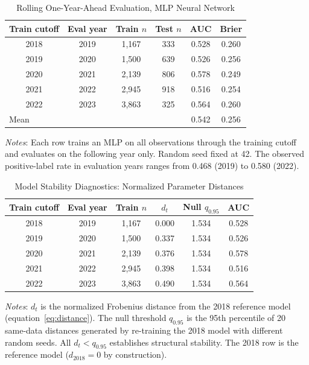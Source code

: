 \documentclass[12pt]{article}
\begin{document}
\begin{table}[H]
\centering
\caption{Rolling One-Year-Ahead Evaluation, MLP Neural Network}\label{tab:rolling}
\begin{threeparttable}
\begin{tabular}{cccccc}
\toprule
Train cutoff & Eval year & Train $n$ & Test $n$ & AUC & Brier \\
\midrule
2018 & 2019 & 1,167 & 333 & 0.528 & 0.260 \\
2019 & 2020 & 1,500 & 639 & 0.526 & 0.256 \\
2020 & 2021 & 2,139 & 806 & 0.578 & 0.249 \\
2021 & 2022 & 2,945 & 918 & 0.516 & 0.254 \\
2022 & 2023 & 3,863 & 325 & 0.564 & 0.260 \\
\midrule
\multicolumn{4}{l}{Mean} & 0.542 & 0.256 \\
\bottomrule
\end{tabular}
\begin{tablenotes}
  \small
  \item \textit{Notes}: Each row trains an MLP on all observations through
  the training cutoff and evaluates on the following year only.  Random
  seed fixed at 42.  The observed positive-label rate in evaluation years
  ranges from 0.468 (2019) to 0.580 (2022).
\end{tablenotes}
\end{threeparttable}
\end{table}

\bigskip

\begin{table}[H]
\centering
\caption{Model Stability Diagnostics: Normalized Parameter Distances}\label{tab:stability}
\begin{threeparttable}
\begin{tabular}{cccccc}
\toprule
Train cutoff & Eval year & Train $n$ & $d_t$ & Null $q_{0.95}$ & AUC \\
\midrule
2018 & 2019 & 1,167 & 0.000 & 1.534 & 0.528 \\
2019 & 2020 & 1,500 & 0.337 & 1.534 & 0.526 \\
2020 & 2021 & 2,139 & 0.376 & 1.534 & 0.578 \\
2021 & 2022 & 2,945 & 0.398 & 1.534 & 0.516 \\
2022 & 2023 & 3,863 & 0.490 & 1.534 & 0.564 \\
\bottomrule
\end{tabular}
\begin{tablenotes}
  \small
  \item \textit{Notes}: $d_t$ is the normalized Frobenius distance
  from the 2018 reference model (equation~\eqref{eq:distance}).  The
  null threshold $q_{0.95}$ is the 95th percentile of 20 same-data
  distances generated by re-training the 2018 model with different
  random seeds.  All $d_t < q_{0.95}$ establishes structural stability.
  The 2018 row is the reference model ($d_{2018}=0$ by construction).
\end{tablenotes}
\end{threeparttable}
\end{table}
\end{document}
